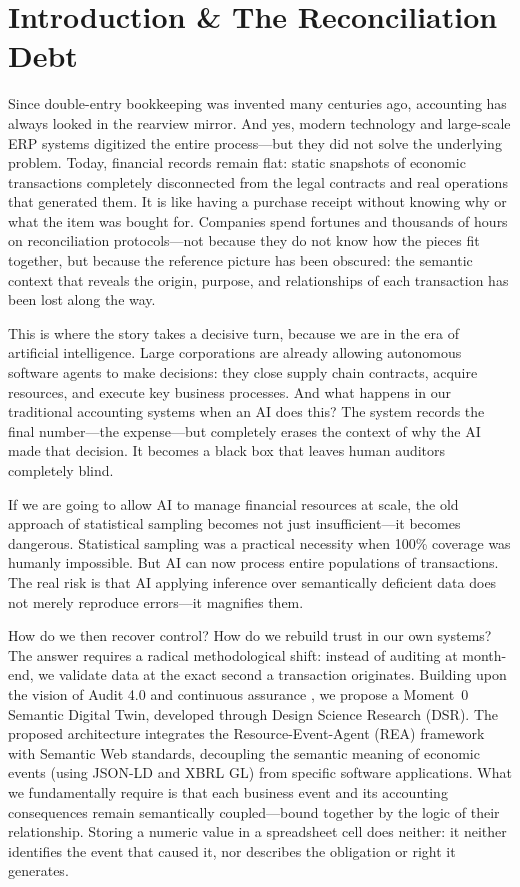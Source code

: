 \documentclass[12pt, a4paper]{article}
\begin{document}
\section{Introduction \& The Reconciliation Debt}

Since double-entry bookkeeping was invented many centuries ago, accounting has always looked in the rearview mirror. And yes, modern technology and large-scale ERP systems digitized the entire process---but they did not solve the underlying problem. Today, financial records remain flat: static snapshots of economic transactions completely disconnected from the legal contracts and real operations that generated them. It is like having a purchase receipt without knowing why or what the item was bought for. Companies spend fortunes and thousands of hours on reconciliation protocols---not because they do not know how the pieces fit together, but because the reference picture has been obscured: the semantic context that reveals the origin, purpose, and relationships of each transaction has been lost along the way.

This is where the story takes a decisive turn, because we are in the era of artificial intelligence. Large corporations are already allowing autonomous software agents to make decisions: they close supply chain contracts, acquire resources, and execute key business processes. And what happens in our traditional accounting systems when an AI does this? The system records the final number---the expense---but completely erases the context of why the AI made that decision. It becomes a black box that leaves human auditors completely blind.

If we are going to allow AI to manage financial resources at scale, the old approach of statistical sampling becomes not just insufficient---it becomes dangerous. Statistical sampling was a practical necessity when 100\% coverage was humanly impossible. But AI can now process entire populations of transactions. The real risk is that AI applying inference over semantically deficient data does not merely reproduce errors---it magnifies them.

How do we then recover control? How do we rebuild trust in our own systems? The answer requires a radical methodological shift: instead of auditing at month-end, we validate data at the exact second a transaction originates. Building upon the vision of Audit 4.0 and continuous assurance \cite{dai2016}, we propose a Moment~0 Semantic Digital Twin, developed through Design Science Research (DSR). The proposed architecture integrates the Resource-Event-Agent (REA) framework with Semantic Web standards, decoupling the semantic meaning of economic events (using JSON-LD and XBRL GL) from specific software applications. What we fundamentally require is that each business event and its accounting consequences remain semantically coupled---bound together by the logic of their relationship. Storing a numeric value in a spreadsheet cell does neither: it neither identifies the event that caused it, nor describes the obligation or right it generates.
\end{document}
